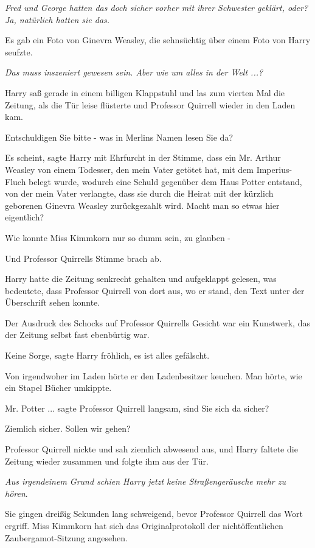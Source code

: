 \emph{Fred und George hatten das doch sicher vorher mit ihrer Schwester geklärt,
oder? Ja, natürlich hatten sie das.}

Es gab ein Foto von Ginevra Weasley, die sehnsüchtig über einem Foto von Harry
seufzte.

\emph{Das muss inszeniert gewesen sein. Aber wie um alles in der Welt ...?}

Harry saß gerade in einem billigen Klappstuhl und las zum vierten Mal die
Zeitung, als die Tür leise flüsterte und Professor Quirrell wieder in den Laden
kam.

\glqq{}Entschuldigen Sie bitte - was in Merlins Namen lesen Sie da?\grqq{}

\glqq{}Es scheint\grqq{}, sagte Harry mit Ehrfurcht in der Stimme, \glqq{}dass
ein Mr. Arthur Weasley von einem Todesser, den mein Vater getötet hat, mit dem
Imperius-Fluch belegt wurde, wodurch eine Schuld gegenüber dem Haus Potter
entstand, von der mein Vater verlangte, dass sie durch die Heirat mit der
kürzlich geborenen Ginevra Weasley zurückgezahlt wird. Macht man so etwas hier
eigentlich?\grqq{}

\glqq{}Wie konnte Miss Kimmkorn nur so dumm sein, zu glauben -\grqq{}

Und Professor Quirrells Stimme brach ab.

Harry hatte die Zeitung senkrecht gehalten und aufgeklappt gelesen, was
bedeutete, dass Professor Quirrell von dort aus, wo er stand, den Text unter der
Überschrift sehen konnte.

Der Ausdruck des Schocks auf Professor Quirrells Gesicht war ein Kunstwerk, das
der Zeitung selbst fast ebenbürtig war.

\glqq{}Keine Sorge\grqq{}, sagte Harry fröhlich, \glqq{}es ist alles
gefälscht.\grqq{}

Von irgendwoher im Laden hörte er den Ladenbesitzer keuchen. Man hörte, wie ein
Stapel Bücher umkippte.

\glqq{}Mr. Potter ...\grqq{} sagte Professor Quirrell langsam, \glqq{}sind Sie
sich da sicher?\grqq{}

\glqq{}Ziemlich sicher. Sollen wir gehen?\grqq{}

Professor Quirrell nickte und sah ziemlich abwesend aus, und Harry faltete die
Zeitung wieder zusammen und folgte ihm aus der Tür.

\emph{Aus irgendeinem Grund schien Harry jetzt keine Straßengeräusche mehr zu
hören}.

Sie gingen dreißig Sekunden lang schweigend, bevor Professor Quirrell das Wort
ergriff. \glqq{}Miss Kimmkorn hat sich das Originalprotokoll der
nichtöffentlichen Zaubergamot-Sitzung angesehen.\grqq{}

